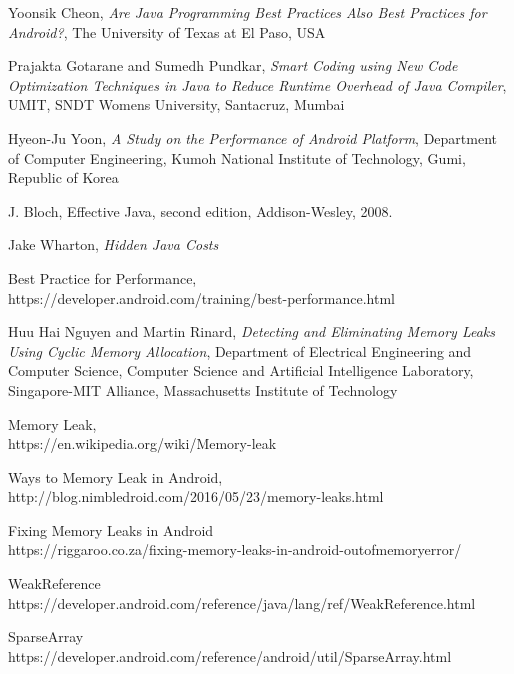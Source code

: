 \documentclass[journal]{IEEEtran}
\begin{document}
\begin{thebibliography}{1}

Yoonsik Cheon, \emph{Are Java Programming Best Practices Also Best Practices for Android?}, The University of Texas at El Paso, USA

\bibitem{}
Prajakta Gotarane and Sumedh Pundkar, \emph{Smart Coding using New Code Optimization Techniques in Java to Reduce Runtime Overhead of Java Compiler}, UMIT, SNDT Womens University, Santacruz, Mumbai

\bibitem{}
Hyeon-Ju Yoon, \emph{A Study on the Performance of Android Platform}, Department of Computer Engineering, Kumoh National Institute of Technology, Gumi, Republic of Korea 

\bibitem{}
J. Bloch, Effective Java, second edition, Addison-Wesley, 2008.

\bibitem{}
Jake Wharton, \emph{Hidden Java Costs}

\bibitem{}
Best Practice for Performance,\\
https://developer.android.com/training/best-performance.html 

\bibitem{}
Huu Hai Nguyen and Martin Rinard, \emph{Detecting and Eliminating Memory Leaks Using Cyclic Memory Allocation}, Department of Electrical Engineering and Computer Science, 
Computer Science and Artificial Intelligence Laboratory, 
Singapore-MIT Alliance, 
Massachusetts Institute of Technology

Memory Leak,\\
https://en.wikipedia.org/wiki/Memory-leak

Ways to Memory Leak in Android,\\
http://blog.nimbledroid.com/2016/05/23/memory-leaks.html

Fixing Memory Leaks in Android\\
https://riggaroo.co.za/fixing-memory-leaks-in-android-outofmemoryerror/

WeakReference\\
https://developer.android.com/reference/java/lang/ref/WeakReference.html

SparseArray\\
https://developer.android.com/reference/android/util/SparseArray.html

\end{thebibliography}
\end{document}
